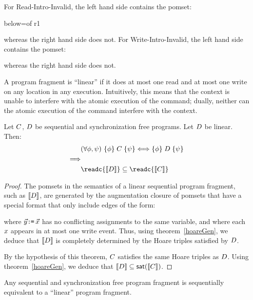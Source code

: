 For Read-Intro-Invalid, the left hand side contains the pomset:
\begin{tikzdisplay}[node distance=1em]
   {below=of r1}
\end{tikzdisplay}
whereas the right hand side does not.   For Write-Intro-Invalid, the left hand side contains the pomset:
\begin{tikzdisplay}
\end{tikzdisplay}
whereas the right hand side does not.


A program fragment is ``linear'' if it does at most one read and at most one write on any location in any execution.  Intuitively, this means that the context is unable to interfere with the atomic execution of the command; dually, neither can the atomic execution of the command interfere with the context.  


\begin{theorem}\label{seqcompleteness}
Let $C$, $D$ be sequential and synchronization free programs.  Let $D$ be linear.  Then:
\begin{align*}
& (\forall \aForm,\bForm) \ \hoare{\aForm}{\aCmd}{\bForm} \Longleftrightarrow \hoare{\aForm}{\bCmd}{\bForm}  \\
\Longrightarrow & \\
& \readc{\sem{\bCmd}} \subseteq \readc{\sem{\aCmd}} 
\end{align*}
\begin{proof}
The pomsets in the semantics of a linear sequential program fragment, such as $\llbracket D\rrbracket$, are generated by the augmentation closure of pomsets that have a special format that only include edges of the form: \begin{tikzdisplay}[node distance=1em]
\end{tikzdisplay}
where $\vec{y}\texttt{:}\mkern-1mu\texttt{=}\, \vec{x}$ has no conflicting assignments to the same variable, and where each $x$ appears in at most one write event. Thus, using  theorem~\ref{hoareGen}, we deduce that $\llbracket D\rrbracket$ is completely determined by the Hoare triples satisfied by $D$.  

By the hypothesis of this theorem, $C$ satisfies the same Hoare triples as $D$.  Using  theorem~\ref{hoareGen}, we deduce that $\llbracket D\rrbracket \subseteq \mathsf{sat}(\llbracket C\rrbracket)$. 
\end{proof}
\end{theorem}
Any sequential and synchronization free  program fragment is sequentially equivalent to a ``linear'' program fragment.  

